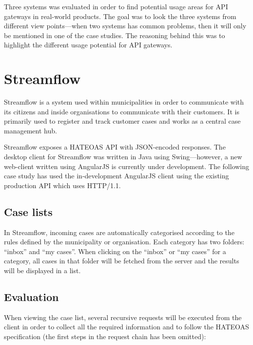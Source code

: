 \documentclass{cslthse-msc}
\begin{document}
Three systems was evaluated in order to find potential usage areas for API gateways in real-world products. The goal was to look the three systems from different view points---when two systems has common problems, then it will only be mentioned in one of the case studies. The reasoning behind this was to highlight the different usage potential for API gateways.

\section{Streamflow}
Streamflow\cite{streamflow} is a system used within municipalities in order to communicate with its citizens and inside organisations to communicate with their customers. It is primarily used to register and track customer cases and works as a central case management hub.

Streamflow exposes a HATEOAS API with JSON-encoded responses. The desktop client for Streamflow was written in Java using Swing---however, a new web-client written using AngularJS is currently under development. The following case study has used the in-development AngularJS client using the existing production API which uses HTTP/1.1.

\subsection{Case lists}
In Streamflow, incoming cases are automatically categorised according to the rules defined by the municipality or organisation. Each category has two folders: \enquote{inbox} and \enquote{my cases}. When clicking on the \enquote{inbox} or \enquote{my cases} for a category, all cases in that folder will be fetched from the server and the results will be displayed in a list.

\subsection{Evaluation}
When viewing the case list, several recursive requests will be executed from the client in order to collect all the required information and to follow the HATEOAS specification (the first steps in the request chain has been omitted):
\end{document}

